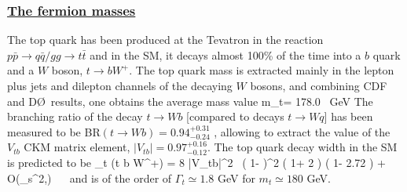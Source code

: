 \subsubsection*{\underline{The fermion masses}} 

The top quark has been produced at the Tevatron in the reaction $p\bar{p}
\to q \bar{q}/ gg \to t\bar{t}$ and in the SM, it decays almost 100\% of the 
time into a $b$ quark and a $W$ boson, $t \to b W^+$. The top  quark mass is 
extracted mainly in the lepton plus jets and dilepton channels of the decaying 
$W$ bosons,  and combining CDF and D\O\ results, one obtains the average mass 
value \cite{Mt-Tevatron}
\beq
m_t= 178.0 ~{\rm GeV}
\eeq
The branching ratio of the decay $t \to Wb$ [compared to decays $t \to Wq]$ has
been measured to be BR$( t \to Wb)=0.94^{+0.31}_{-0.24}$ \cite{PDG}, allowing 
to extract the value of the $V_{tb}$ CKM matrix element, $|V_{tb}|=0.97^{+0.16}
_{-0.12}$. The top quark decay width in the SM is predicted to be 
\cite{Top-RC,Top-LHC,Top-width} 
\beq
\Gamma_t \simeq \Gamma (t \to b W^+) =  {8 \pi} 
|V_{tb}|^2 \, \left( 1-  \right)^2 
\left( 1+ 2 \right) 
\left( 1- 2.72  \right) + {\cal O}(\alpha_s^2,\alpha) \ \
\eeq
and is of the order of $\Gamma_t \simeq 1.8$ GeV for $m_t \simeq 180$ GeV.\s

